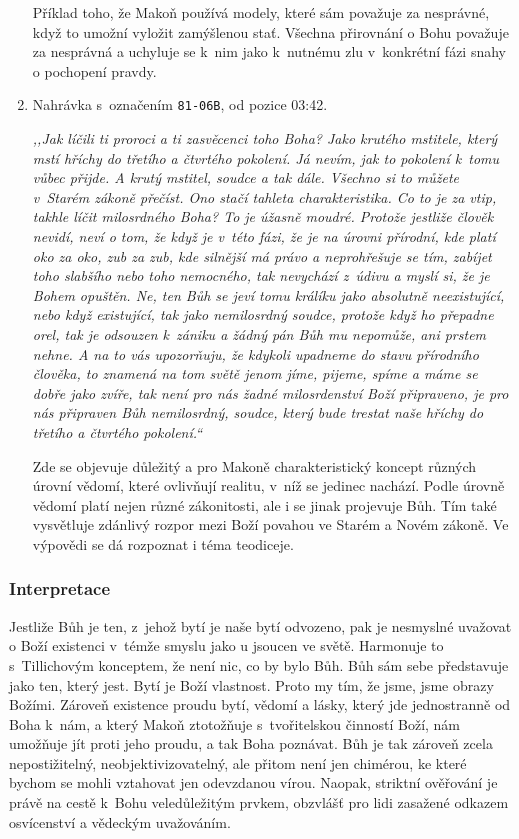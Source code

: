 \begin{enumerate}
{Příklad toho, že Makoň používá modely, které sám považuje za nesprávné, když to
umožní vyložit zamýšlenou stať. Všechna přirovnání o Bohu považuje za nesprávná
a uchyluje se k~nim jako k~nutnému zlu v~konkrétní fázi snahy o pochopení
pravdy.

}

\item{%
Nahrávka s~označením \texttt{81-06B}, od pozice 03:42.

\textit{%
,,Jak líčili ti proroci a ti zasvěcenci toho Boha? Jako krutého mstitele, který
mstí hříchy do třetího a čtvrtého pokolení. Já nevím, jak to pokolení k~tomu
vůbec přijde. A krutý mstitel,
soudce a tak dále. Všechno si to můžete v~Starém zákoně přečíst. Ono stačí tahleta
charakteristika. Co to je za vtip, takhle líčit milosrdného Boha? To je úžasně
moudré.
Protože jestliže člověk nevidí, neví o tom, že když je v~této fázi, že je na úrovni
přírodní, kde platí oko za oko, zub za zub, kde silnější má právo a neprohřešuje
se tím, zabíjet toho slabšího nebo toho nemocného, tak nevychází z~údivu a
myslí si,
že je Bohem opuštěn. Ne, ten Bůh se jeví tomu králíku jako absolutně
neexistující,
nebo když existující, tak jako nemilosrdný soudce, protože když ho přepadne orel,
tak je odsouzen k~zániku a žádný pán Bůh mu nepomůže, ani prstem nehne. A na to
vás upozorňuju, že kdykoli upadneme do stavu přírodního člověka, to znamená na
tom světě jenom jíme, pijeme, spíme a máme se dobře jako zvíře, tak není pro nás
žadné milosrdenství Boží připraveno, je pro nás připraven Bůh nemilosrdný,
soudce, který bude trestat naše hříchy do třetího a čtvrtého pokolení.``
}

Zde se objevuje důležitý a pro Makoně charakteristický koncept různých úrovní
vědomí, které ovlivňují realitu, v~níž se jedinec nachází. Podle úrovně vědomí
platí nejen různé zákonitosti, ale i se jinak projevuje Bůh. Tím také vysvětluje
zdánlivý rozpor mezi Boží povahou ve Starém a Novém zákoně. Ve výpovědi se dá
rozpoznat i téma teodiceje.

}

\end{enumerate}

\subsubsection*{Interpretace}

Jestliže Bůh je ten, z~jehož bytí je naše bytí odvozeno, pak je nesmyslné
uvažovat o Boží existenci v~témže smyslu jako u jsoucen ve světě. Harmonuje to
s~Tillichovým konceptem, že není nic, co by bylo Bůh.
Bůh sám sebe představuje jako ten, který jest. Bytí je Boží vlastnost. Proto my
tím, že jsme, jsme obrazy Božími. Zároveň existence proudu bytí, vědomí a lásky,
který jde jednostranně od Boha k~nám, a který Makoň ztotožňuje s~tvořitelskou
činností Boží, nám umožňuje jít proti jeho proudu, a tak Boha poznávat. Bůh je
tak zároveň zcela nepostižitelný, neobjektivizovatelný, ale přitom není jen
chimérou, ke které bychom se mohli vztahovat jen odevzdanou vírou. Naopak,
striktní ověřování je právě na cestě k~Bohu veledůležitým prvkem, obzvlášť pro
lidi zasažené odkazem osvícenství a vědeckým uvažováním.

